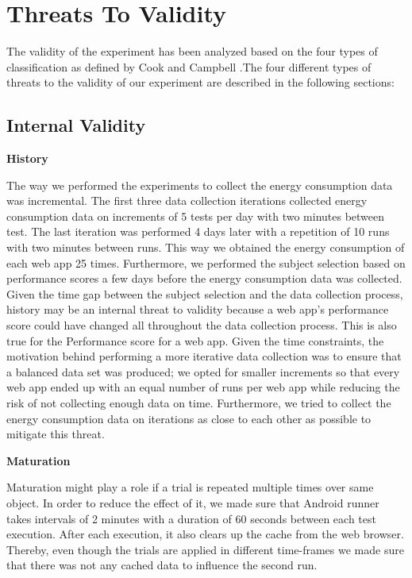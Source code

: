 \section{Threats To Validity}\label{sec:threats}
The validity of the experiment has been analyzed based on the four types of classification as defined by Cook and Campbell \cite{Book:Quasi-exp}.The four different types of threats to the validity of our experiment are described in the following sections:

\subsection{Internal Validity}

\textbf{History}

The way we performed the experiments to collect the energy consumption data was incremental. The first three data collection iterations collected energy consumption data on increments of 5 tests per day with two minutes between test. The last iteration was performed 4 days later with a repetition of 10 runs with two minutes between runs. This way we obtained the energy consumption of each web app 25 times. Furthermore, we performed the subject selection based on performance scores a few days before the energy consumption data was collected. Given the time gap between the subject selection and the data collection process, history may be  an internal threat to validity because a web app's performance score could have changed all throughout the data collection process.  
This is also true for the Performance score for a web app.  Given the time constraints, the motivation behind performing a more iterative data collection was to ensure that a balanced data set was produced; we opted for smaller increments so that every web app ended up with an equal number of runs per web app while reducing the risk of not collecting enough data on time. Furthermore, we tried to collect the energy consumption data on iterations as close to each other as possible to mitigate this threat.   \newline


\textbf{Maturation}

Maturation might play a role if a trial is repeated multiple times over same object.  In order to reduce the effect of it, we made sure that Android runner takes intervals of 2 minutes with a duration of 60 seconds between each test execution. After each execution, it also clears up the cache from the web browser. Thereby, even though the trials are applied in different time-frames we made sure that there was not any cached data to influence the second run. \newline


